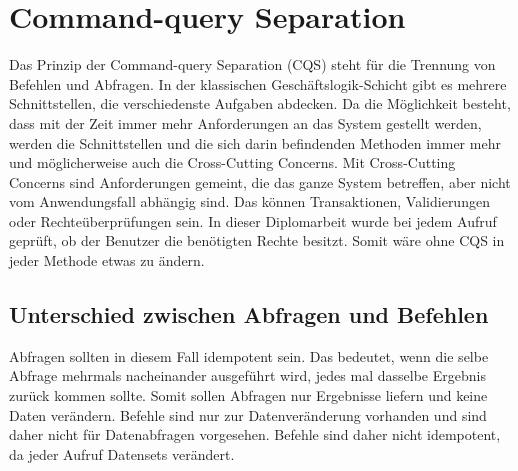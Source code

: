 \chapter{Command-query Separation}
Das Prinzip der Command-query Separation (CQS) steht für die Trennung von Befehlen und Abfragen. In der klassischen Geschäftslogik-Schicht gibt es mehrere Schnittstellen, die verschiedenste Aufgaben abdecken. Da die Möglichkeit besteht, dass  mit der Zeit immer mehr Anforderungen an das System gestellt werden, werden die Schnittstellen und die sich darin befindenden Methoden immer mehr und möglicherweise auch die Cross-Cutting Concerns. Mit Cross-Cutting Concerns sind Anforderungen gemeint, die das ganze System betreffen, aber nicht vom Anwendungsfall abhängig sind. Das können Transaktionen, Validierungen oder Rechteüberprüfungen sein. In dieser Diplomarbeit wurde bei jedem Aufruf geprüft, ob der Benutzer die benötigten Rechte besitzt. Somit wäre ohne CQS in jeder Methode etwas zu ändern. \autocite{cqsSOLIDeArchitektur}\\
\section{Unterschied zwischen Abfragen und Befehlen}
Abfragen sollten in diesem Fall idempotent sein. Das bedeutet, wenn die selbe Abfrage mehrmals nacheinander ausgeführt wird, jedes mal dasselbe Ergebnis zurück kommen sollte. Somit sollen Abfragen nur Ergebnisse liefern und keine Daten verändern.
Befehle sind nur zur Datenveränderung vorhanden und sind daher nicht für Datenabfragen vorgesehen. Befehle sind daher nicht idempotent, da jeder Aufruf Datensets verändert.
